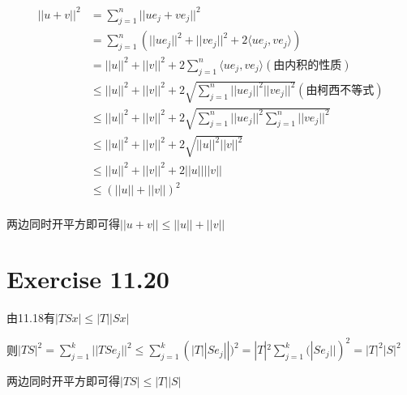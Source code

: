 \documentclass[twoside,a4paper]{article}
\begin{document}
\begin{align}
  ||u+v||^2&= \sum_{j=1}^n||ue_j+ve_j||^2\\
  &= \sum_{j=1}^n(||ue_j||^2+||ve_j||^2+2\langle ue_j,ve_j\rangle)\\
  &=||u||^2+||v||^2+2\sum_{j=1}^n\langle ue_j,ve_j\rangle(\mbox{由内积的性质})\\
  &\le ||u||^2+||v||^2+2\sqrt{\sum_{j=1}^n||ue_j||^2||ve_j||^2}(\mbox{由柯西不等式})\\
  &\le ||u||^2+||v||^2+2\sqrt{\sum_{j=1}^n||ue_j||^2\sum_{j=1}^n||ve_j||^2}\\
  &\le ||u||^2+||v||^2+2\sqrt{||u||^2||v||^2}\\
  &\le ||u||^2+||v||^2+2||u||||v||\\
  &\le (||u||+||v||)^2\\
\end{align}

两边同时开平方即可得$||u+v||\le ||u||+||v||$


\section{Exercise 11.20}

由11.18有$|TSx|\le|T||Sx|$

则$|TS|^2=\sum_{j=1}^k||TSe_j||^2\le\sum_{j=1}^k(|T||Se_j||)^2=|T|^2\sum_{j=1}^k(|Se_j||)^2=|T|^2|S|^2$

两边同时开平方即可得$|TS|\le|T||S|$
\end{document}
